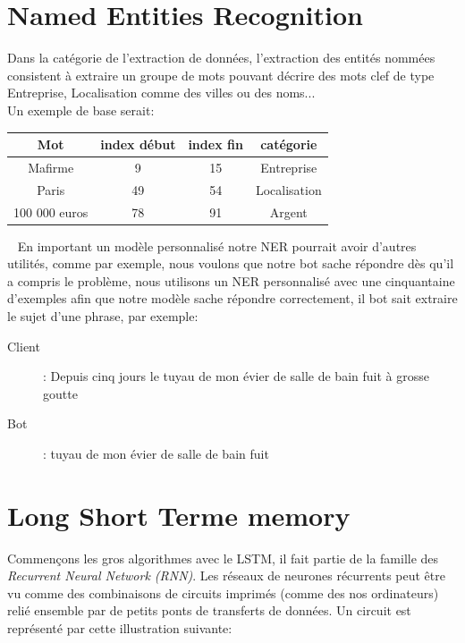 \pagebreak
\section{Named Entities Recognition}
Dans la catégorie de l'extraction de données, l'extraction des entités nommées consistent à extraire un groupe de mots pouvant décrire des mots clef de type Entreprise, Localisation comme des villes ou des noms...\\
Un exemple de base serait:\\


\begin{tabular}{c|cc|c}
Mot & index début & index fin & catégorie \\
\hline
Mafirme & 9 & 15 & Entreprise\\
Paris & 49 & 54 & Localisation\\
100 000 euros & 78 & 91 & Argent\\
\end{tabular}

\ \linebreak
En important un modèle personnalisé notre NER pourrait avoir d'autres utilités, comme par exemple,  nous voulons que notre bot sache répondre dès qu'il  a compris le problème, nous utilisons un NER personnalisé avec une cinquantaine d'exemples afin que notre modèle sache répondre correctement, il bot sait extraire le sujet d'une phrase, par exemple:

\begin{description}
\item[Client]: Depuis cinq jours le tuyau de mon évier de salle de bain fuit à grosse goutte
\item[Bot]: tuyau de mon évier de salle de bain fuit
\end{description}

\pagebreak
\section{Long Short Terme memory}
Commençons les gros algorithmes avec le LSTM, il fait partie de la famille des \textit{Recurrent Neural Network (RNN)}. Les réseaux de neurones récurrents peut être vu comme des combinaisons de circuits imprimés (comme des nos ordinateurs) relié ensemble par de petits ponts de transferts de données. 
Un circuit est représenté par cette illustration suivante:

